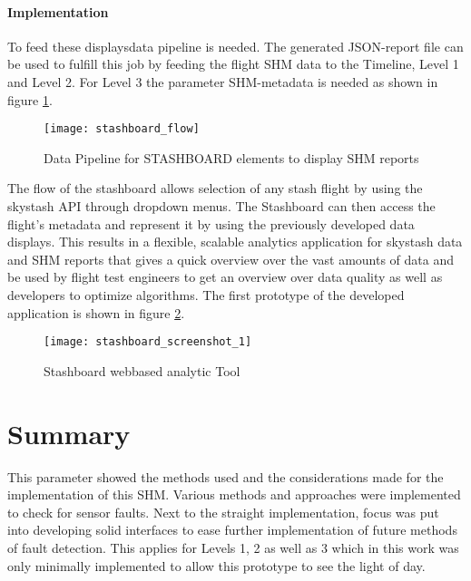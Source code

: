 \paragraph{Implementation}
To feed these displaysdata pipeline is needed. The generated JSON-report file can be used to fulfill this job by feeding the flight SHM data to the Timeline, Level 1 and Level 2. For Level 3 the parameter SHM-metadata is needed as shown in figure \ref{fig:stashboard_flow}.

\begin{figure}[!h]
    \centering
    \texttt{[image: stashboard\_flow]}
    \caption{Data Pipeline for STASHBOARD elements to display SHM reports}
    \label{fig:stashboard_flow}
\end{figure}

The flow of the stashboard allows selection of any stash flight by using the skystash API through dropdown menus. The Stashboard can then access the flight's metadata and represent it by using the previously developed data displays.
This results in a flexible, scalable analytics application for skystash data and SHM reports that gives a quick overview over the vast amounts of data and be used by flight test engineers to get an overview over data quality as well as developers to optimize algorithms. The first prototype of the developed application is shown in figure \ref{fig:stashboard}.

\begin{figure}[!h]
    \centering
    \texttt{[image: stashboard\_screenshot\_1]}
    \caption{Stashboard webbased analytic Tool }
    \label{fig:stashboard}
\end{figure}


\newpage
\section{Summary}

This parameter showed the methods used and the considerations made for the implementation of this SHM. Various methods and approaches were implemented to check for sensor faults. Next to the straight implementation, focus was put into developing solid interfaces to ease further implementation of future methods of fault detection. This applies for Levels 1, 2 as well as 3 which in this work was only minimally implemented to allow this prototype to see the light of day.





